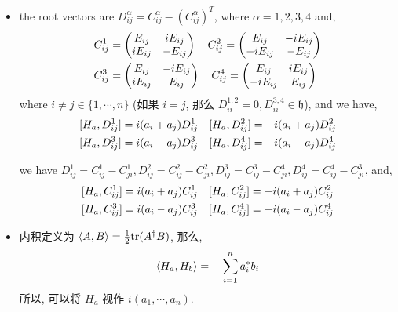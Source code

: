 \begin{itemize}
	\item the root vectors are $D^\alpha_{i j} = C^\alpha_{i j} - (C^{\alpha}_{i j})^T$, where $\alpha = 1, 2, 3, 4$ and,
	\begin{align}
		& C^1_{i j} = \begin{pmatrix}
			E_{i j} & i E_{i j} \\
			i E_{i j} & - E_{i j}
		\end{pmatrix} \quad C^2_{i j} = \begin{pmatrix}
			E_{i j} & - i E_{i j} \\
			- i E_{i j} & - E_{i j}
		\end{pmatrix} \notag \\
		& C^3_{i j} = \begin{pmatrix}
			E_{i j} & - i E_{i j} \\
			i E_{i j} & E_{i j}
		\end{pmatrix} \quad C^4_{i j} = \begin{pmatrix}
			E_{i j} & i E_{i j} \\
			- i E_{i j} & E_{i j}
		\end{pmatrix} \label{6.7.11}
	\end{align}
	where $i \neq j \in \{1, \cdots, n\}$ (如果 $i = j$, 那么 $D^{1, 2}_{i i} = 0, D^{3, 4}_{i i} \in \mathfrak{h}$), and we have,
	\begin{align}
		& [H_a, D^1_{i j}] = i (a_i + a_j) D^1_{i j} \quad [H_a, D^2_{i j}] = - i (a_i + a_j) D^2_{i j} \notag \\
		& [H_a, D^3_{i j}] = i (a_i - a_j) D^3_{i j} \quad [H_a, D^4_{i j}] = - i (a_i - a_j) D^4_{i j}
	\end{align}
	
	\begin{tcolorbox}[title=calculation:]
		we have $D^1_{i j} = C^1_{i j} - C^1_{j i}, D^2_{i j} = C^2_{i j} - C^2_{j i}, D^3_{i j} = C^3_{i j} - C^4_{j i}, D^4_{i j} = C^4_{i j} - C^3_{j i}$, and,
		\begin{align}
			& [H_a, C^1_{i j}] = i (a_i + a_j) C^1_{i j} \quad [H_a, C^2_{i j}] = - i (a_i + a_j) C^2_{i j} \notag \\
			& [H_a, C^3_{i j}] = i (a_i - a_j) C^3_{i j} \quad [H_a, C^4_{i j}] = - i (a_i - a_j) C^4_{i j}
		\end{align}
	\end{tcolorbox}
	
	\item 内积定义为 $\braket{A, B} = \frac{1}{2} \mathrm{tr}(A^\dag B)$, 那么,
	\begin{equation}
		\braket{H_a, H_b} = - \sum_{i = 1}^n a_i^* b_i
	\end{equation}
	所以, 可以将 $H_a$ 视作 $i (a_1, \cdots, a_n)$.
	

\end{itemize}
